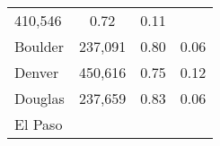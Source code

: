 \documentclass[]{article}
\begin{document}
\begin{longtable}[]{@{}lccc@{}}
\begin{minipage}[t]{0.24\columnwidth}
410,546\strut
\end{minipage} & \begin{minipage}[t]{0.29\columnwidth}\centering\strut
0.72\strut
\end{minipage} & \begin{minipage}[t]{0.25\columnwidth}\centering\strut
0.11\strut
\end{minipage}\tabularnewline
\begin{minipage}[t]{0.10\columnwidth}\raggedright\strut
Boulder\strut
\end{minipage} & \begin{minipage}[t]{0.24\columnwidth}\centering\strut
237,091\strut
\end{minipage} & \begin{minipage}[t]{0.29\columnwidth}\centering\strut
0.80\strut
\end{minipage} & \begin{minipage}[t]{0.25\columnwidth}\centering\strut
0.06\strut
\end{minipage}\tabularnewline
\begin{minipage}[t]{0.10\columnwidth}\raggedright\strut
Denver\strut
\end{minipage} & \begin{minipage}[t]{0.24\columnwidth}\centering\strut
450,616\strut
\end{minipage} & \begin{minipage}[t]{0.29\columnwidth}\centering\strut
0.75\strut
\end{minipage} & \begin{minipage}[t]{0.25\columnwidth}\centering\strut
0.12\strut
\end{minipage}\tabularnewline
\begin{minipage}[t]{0.10\columnwidth}\raggedright\strut
Douglas\strut
\end{minipage} & \begin{minipage}[t]{0.24\columnwidth}\centering\strut
237,659\strut
\end{minipage} & \begin{minipage}[t]{0.29\columnwidth}\centering\strut
0.83\strut
\end{minipage} & \begin{minipage}[t]{0.25\columnwidth}\centering\strut
0.06\strut
\end{minipage}\tabularnewline
\begin{minipage}[t]{0.10\columnwidth}\raggedright\strut
El Paso\strut
\end{minipage} & \begin{minipage}[t]{0.24\columnwidth}\centering\strut

\end{minipage}
\end{longtable}
\end{document}
